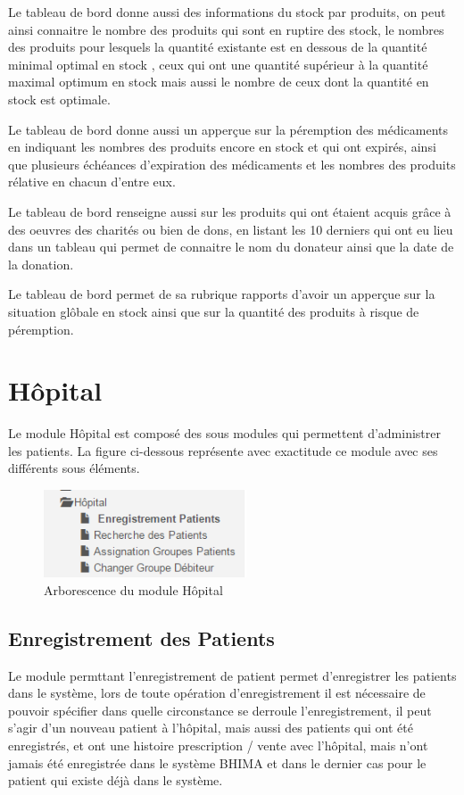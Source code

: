 \documentclass[12pt,a4paper]{report}
\begin{document}
Le tableau de bord donne aussi des informations du stock par produits, on peut ainsi connaitre le nombre des produits qui sont en ruptire des stock, le nombres des produits pour lesquels la quantité existante est en dessous de la quantité minimal optimal en stock , ceux qui ont une quantité supérieur à la quantité maximal optimum en stock mais aussi le nombre de ceux dont la quantité en stock est optimale.

Le tableau de bord donne aussi un apperçue sur la péremption des médicaments en indiquant les nombres des produits encore en stock et qui ont expirés, ainsi que plusieurs échéances d'expiration des médicaments et les nombres des produits rélative en chacun d'entre eux.

Le tableau de bord renseigne aussi sur les produits qui ont étaient acquis grâce à des oeuvres des charités ou bien de dons, en listant les 10 derniers qui ont eu lieu dans un tableau qui permet de connaitre le nom du donateur ainsi que la date de la donation.

Le tableau de bord permet de sa rubrique rapports d'avoir un apperçue sur la situation glôbale en stock ainsi que sur la quantité des produits à risque de péremption.


\newpage
\chapter{Hôpital}        

Le module Hôpital est composé des sous modules qui permettent d'administrer les patients. La figure ci-dessous représente avec exactitude ce module avec ses différents sous éléments.

\begin{figure}[h]
\begin{center}
\includegraphics[width=6cm]{pic/HopitalArbo.png}
\end{center}
\caption{Arborescence du module Hôpital}
\label{Arborescence du module Hôpital}
\end{figure}

\section{Enregistrement des Patients}
Le module permttant l'enregistrement de patient permet d'enregistrer les patients dans le système, lors de toute opération d'enregistrement il est nécessaire de pouvoir spécifier dans quelle circonstance se derroule l'enregistrement, il peut s'agir d'un nouveau patient à l'hôpital, mais aussi des patients qui ont été enregistrés, et ont une histoire prescription / vente avec l'hôpital, mais n'ont jamais été enregistrée dans le système BHIMA et dans le dernier cas pour le patient qui existe déjà dans le système. 
\end{document}
